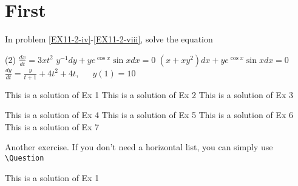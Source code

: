 \documentclass{book}
\begin{document}
    \chapter{First}

    \begin{Exercise}\label{EX11}
        \vspace{-\baselineskip}%
        
        \Question In problem \ref{EX11-2-iv}-\ref{EX11-2-viii}, solve the equation 
        \begin{tasks}[resume=true](2)
            \task\label{EX11-2-iv} $\frac{dx}{dt}=3xt^2$
            \task $y^{-1}dy+ye^{\cos{x}}\sin{x}dx=0$
            \task $(x+xy^2)dx+ye^{\cos{x}}\sin{x}dx=0$
            \task\label{EX11-2-viii} $\frac{dy}{dt} = \frac{y}{t+1} + 4t^2 +  4t$, $\quad$ $y(1) = 10$
        \end{tasks}
    \end{Exercise}
    \begin{multicols}{2}
        \begin{Answer}[ref={EX11}]
            \Question 
            \begin{tasks}
                \task This is a solution of Ex 1
                \task This is a solution of Ex 2 
                \task This is a solution of Ex 3 
            \end{tasks} 
            \Question 
            \begin{tasks}[resume=true]
                \task This is a solution of Ex 4
                \task This is a solution of Ex 5 
                \task This is a solution of Ex 6 
                \task This is a solution of Ex 7 
            \end{tasks} 
        \end{Answer}
    \end{multicols}

    \begin{Exercise}\label{EX12}
        Another exercise. 
        \Question If you don't need a horizontal list, you can simply use \verb|\Question|
    \end{Exercise}
    \begin{multicols}{2}
        \begin{Answer}[ref={EX12}]
            \Question This is a solution of Ex 1
        \end{Answer}
    \end{multicols}
\end{document}
